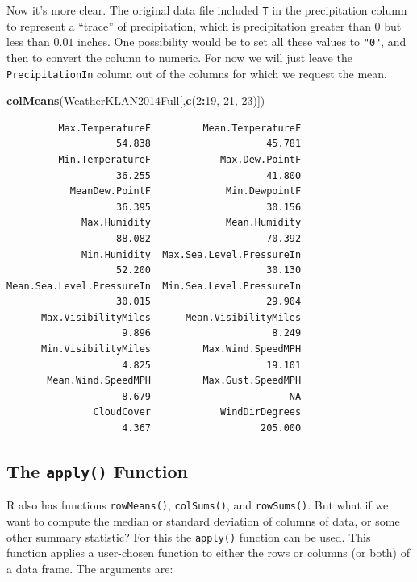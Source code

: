 \documentclass[
]{krantz}
\makeatletter
\newenvironment{Shaded}{\begin{snugshade}}{\end{snugshade}}
\newcommand{\DecValTok}[1]{\textcolor[rgb]{0.06,0.06,0.06}{#1}}
\newcommand{\KeywordTok}[1]{\textcolor[rgb]{0.27,0.27,0.27}{\textbf{#1}}}
\newcommand{\NormalTok}[1]{#1}
\newcommand{\OperatorTok}[1]{\textcolor[rgb]{0.43,0.43,0.43}{\textbf{#1}}}
\newenvironment{kframe}{%
\medskip{}
\setlength{\fboxsep}{.8em}
 \def\at@end@of@kframe{}%
 \ifinner\ifhmode%
  \def\at@end@of@kframe{\end{minipage}}%
  \begin{minipage}{\columnwidth}%
 \fi\fi%
 \def\FrameCommand##1{\hskip\@totalleftmargin \hskip-\fboxsep
 \colorbox{shadecolor}{##1}\hskip-\fboxsep
     \hskip-\linewidth \hskip-\@totalleftmargin \hskip\columnwidth}%
 \MakeFramed {\advance\hsize-\width
   \@totalleftmargin\z@ \linewidth\hsize
   \@setminipage}}%
 {\par\unskip\endMakeFramed%
 \at@end@of@kframe}
\renewenvironment{Shaded}{\begin{kframe}}{\end{kframe}}
\makeatother
\begin{document}
Now it's more clear. The original data file included \texttt{T} in the precipitation column to represent a ``trace'' of precipitation, which is precipitation greater than \(0\) but less than \(0.01\) inches. One possibility would be to set all these values to \texttt{"0"}, and then to convert the column to numeric. For now we will just leave the \texttt{PrecipitationIn} column out of the columns for which we request the mean.

\begin{Shaded}
\begin{Highlighting}[]
\KeywordTok{colMeans}\NormalTok{(WeatherKLAN2014Full[,}\KeywordTok{c}\NormalTok{(}\DecValTok{2}\OperatorTok{:}\DecValTok{19}\NormalTok{, }\DecValTok{21}\NormalTok{, }\DecValTok{23}\NormalTok{)])}
\end{Highlighting}
\end{Shaded}

\begin{verbatim}
         Max.TemperatureF         Mean.TemperatureF 
                   54.838                    45.781 
         Min.TemperatureF            Max.Dew.PointF 
                   36.255                    41.800 
           MeanDew.PointF             Min.DewpointF 
                   36.395                    30.156 
             Max.Humidity             Mean.Humidity 
                   88.082                    70.392 
             Min.Humidity  Max.Sea.Level.PressureIn 
                   52.200                    30.130 
Mean.Sea.Level.PressureIn  Min.Sea.Level.PressureIn 
                   30.015                    29.904 
      Max.VisibilityMiles      Mean.VisibilityMiles 
                    9.896                     8.249 
      Min.VisibilityMiles         Max.Wind.SpeedMPH 
                    4.825                    19.101 
       Mean.Wind.SpeedMPH         Max.Gust.SpeedMPH 
                    8.679                        NA 
               CloudCover            WindDirDegrees 
                    4.367                   205.000 
\end{verbatim}

\hypertarget{apply}{%
\subsection{\texorpdfstring{The \texttt{apply()} Function}{The apply() Function}}\label{apply}}

R also has functions \texttt{rowMeans()}, \texttt{colSums()}, and \texttt{rowSums()}. But what if we want to compute the median or standard deviation of columns of data, or some other summary statistic? For this the \texttt{apply()} function can be used. This function applies a user-chosen function to either the rows or columns (or both) of a data frame. The arguments are:
\end{document}
